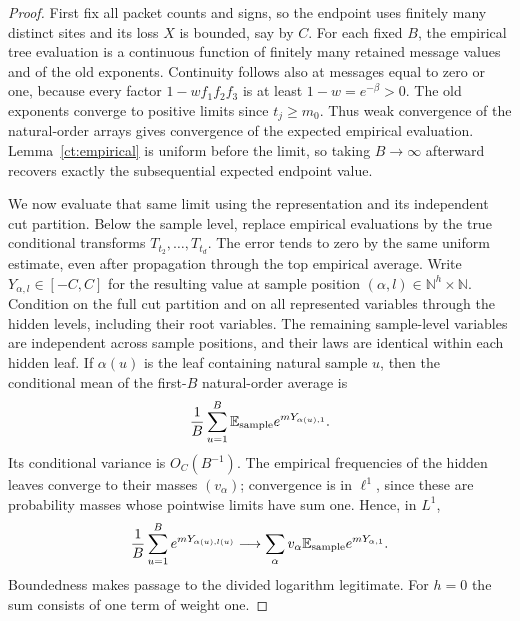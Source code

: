 \begin{proof}
First fix all packet counts and signs, so the endpoint uses finitely
many distinct sites and its loss $X$ is bounded, say by $C$.
For each fixed $B$, the empirical tree evaluation is a continuous
function of finitely many retained message values and of the old
exponents.  Continuity follows also at messages equal to zero or
one, because every factor $1-wf_1f_2f_3$ is at least
$1-w=e^{-\beta}>0$.  The old exponents converge to positive limits
since $t_j\ge m_0$.
Thus weak convergence of the natural-order arrays gives convergence
of the expected empirical evaluation.  Lemma~\ref{ct:empirical}
is uniform before the limit, so taking $B\to\infty$ afterward
recovers exactly the subsequential expected endpoint value.

We now evaluate that same limit using the representation and its
independent cut partition.  Below the sample level, replace
empirical evaluations by the true conditional transforms
$T_{t_2},\ldots,T_{t_d}$.  The error tends to zero by the same
uniform estimate, even after propagation through the top empirical
average.  Write $Y_{\alpha,l}\in[-C,C]$ for the resulting value at
sample position $(\alpha,l)\in\mathbb N^h\times\mathbb N$.
Condition on the full cut partition and on all represented variables
through the hidden levels, including their root variables.  The
remaining sample-level variables are independent across sample
positions, and their laws are identical within each hidden leaf.
If $\alpha(u)$ is the leaf containing natural sample $u$, then
the conditional mean of the first-$B$ natural-order average is
\[
  \frac1B\sum_{u=1}^B
          \mathbb E_{\rm sample}e^{mY_{\alpha(u),1}}.
\]
Its conditional variance is $O_C(B^{-1})$.  The empirical
frequencies of the hidden leaves converge to their masses
$(v_\alpha)$; convergence is in $\ell^1$, since these are
probability masses whose pointwise limits have sum one.  Hence,
in $L^1$,
\begin{equation}\label{ct:natural-average}
 \frac1B\sum_{u=1}^B e^{mY_{\alpha(u),l(u)}}
   \longrightarrow
       \sum_\alpha v_\alpha\mathbb E_{\rm sample}e^{mY_{\alpha,1}}.
\end{equation}
Boundedness makes passage to the divided logarithm legitimate.
For $h=0$ the sum consists of one term of weight one.


\end{proof}
